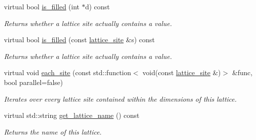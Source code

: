 \begin{DoxyCompactItemize}
\mbox{\label{classsisl_1_1cartesian__planar_aa8066a6406ec8a5dc44121067c0cfb15}} 
virtual bool \hyperlink{classsisl_1_1cartesian__planar_aa8066a6406ec8a5dc44121067c0cfb15}{is\+\_\+filled} (int $\ast$d) const
\begin{DoxyCompactList}\small\item\em Returns whether a lattice site actually contains a value. \end{DoxyCompactList}\item 
\mbox{\label{classsisl_1_1cartesian__planar_a5dd470e0b4d0966c38946c7e384d4090}} 
virtual bool \hyperlink{classsisl_1_1cartesian__planar_a5dd470e0b4d0966c38946c7e384d4090}{is\+\_\+filled} (const \hyperlink{namespacesisl_acd18feee4026583db6185df2b25434aa}{lattice\+\_\+site} \&s) const
\begin{DoxyCompactList}\small\item\em Returns whether a lattice site actually contains a value. \end{DoxyCompactList}\item 
\mbox{\label{classsisl_1_1cartesian__planar_a8b1edfccbcc7bfbd9bd596d822fe51ea}} 
virtual void \hyperlink{classsisl_1_1cartesian__planar_a8b1edfccbcc7bfbd9bd596d822fe51ea}{each\+\_\+site} (const std\+::function$<$ void(const \hyperlink{namespacesisl_acd18feee4026583db6185df2b25434aa}{lattice\+\_\+site} \&)$>$ \&func, bool parallel=false)
\begin{DoxyCompactList}\small\item\em Iterates over every lattice site contained within the dimensions of this lattice. \end{DoxyCompactList}\item 
\mbox{\label{classsisl_1_1cartesian__planar_ac71927dde6e99d60d8e5fe57601ca5a7}} 
virtual std\+::string \hyperlink{classsisl_1_1cartesian__planar_ac71927dde6e99d60d8e5fe57601ca5a7}{get\+\_\+lattice\+\_\+name} () const
\begin{DoxyCompactList}\small\item\em Returns the name of this lattice. \end{DoxyCompactList}\item 
\mbox{\label{classsisl_1_1cartesian__planar_a1c56e22aac7799696512deecef69fc2b}} 

\end{DoxyCompactItemize}
